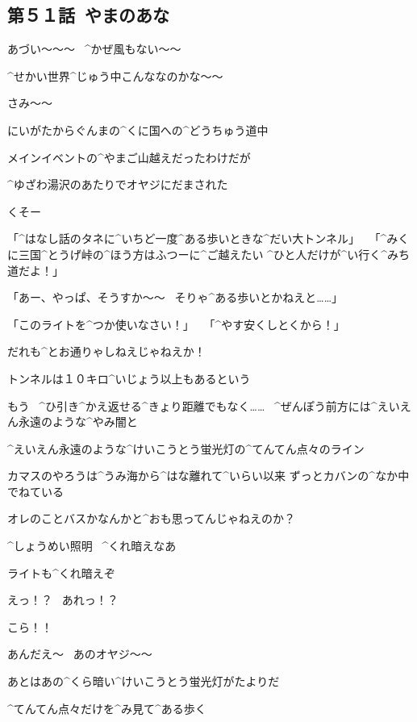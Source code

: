 \subsection{第５１話\ やまのあな}

\page[107]
\Alpha あづい〜〜〜
\ ^{かぜ}{風}もない〜〜

\Alpha ^{せかい}{世界}^{じゅう}{中}こんななのかな〜〜

\page
\Ayase さみ〜〜

\Ayase にいがたからぐんまの^{くに}{国}への^{どうちゅう}{道中}

\Ayase メインイベントの^{やまご}{山越}えだったわけだが

\Ayase ^{ゆざわ}{湯沢}のあたりでオヤジにだまされた

\Ayase くそー

\page
\Person 「^{はなし}{話}のタネに^{いちど}{一度}^{ある}{歩}いときな^{だい}{大}トンネル」
\ 「^{みくに}{三国}^{とうげ}{峠}の^{ほう}{方}はふつーに^{ご}{越}えたい
  ^{ひと}{人}だけが^{い}{行}く^{みち}{道}だよ！」

\Ayase 「あー、やっぱ、そうすか〜〜
  \ そりゃ^{ある}{歩}いとかねえと……」

\Person 「このライトを^{つか}{使}いなさい！」
\ 「^{やす}{安}くしとくから！」

\page
\Ayase だれも^{とお}{通}りゃしねえじゃねえか！

\Ayase トンネルは１０キロ^{いじょう}{以上}もあるという

\Ayase もう
\ ^{ひ}{引}き^{かえ}{返}せる^{きょり}{距離}でもなく……
\ ^{ぜんぽう}{前方}には^{えいえん}{永遠}のような^{やみ}{闇}と

\Ayase ^{えいえん}{永遠}のような^{けいこうとう}{蛍光灯}の^{てんてん}{点々}のライン

\page
\Ayase カマスのやろうは^{うみ}{海}から^{はな}{離}れて^{いらい}{以来}
ずっとカバンの^{なか}{中}でねている

\Ayase オレのことバスかなんかと^{おも}{思}ってんじゃねえのか？

\Ayase ^{しょうめい}{照明}
\ ^{くれ}{暗}えなあ

\page
\Ayase ライトも^{くれ}{暗}えぞ

\Ayase えっ！？
\ あれっ！？

\Ayase こら！！

\Ayase あんだえ〜
\ あのオヤジ〜〜

\page
\Ayase あとはあの^{くら}{暗}い^{けいこうとう}{蛍光灯}がたよりだ

\Ayase ^{てんてん}{点々}だけを^{み}{見}て^{ある}{歩}く

